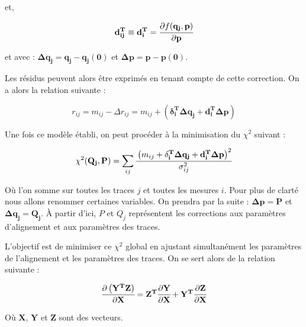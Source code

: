 \begin{appendices}
   et, 
   
   \begin{equation}
     \mathbf{d_{ij}^T} \equiv \mathbf{d_i^T} = \cfrac{\partial f(\mathbf{q_j},\mathbf{p})}{\partial \mathbf{p} }
   \end{equation}
   
   et avec : $\mathbf{\Delta q_j} = \mathbf{q_j} - \mathbf{q_j(0)}$ et $ \mathbf{\Delta p} = \mathbf{p} - \mathbf{p(0)} $.
   
   \medskip
   
   Les r\'esidus peuvent alors \^etre exprim\'es en tenant compte de cette correction. On a alors la relation suivante :
   
   \begin{equation}
   r_{ij} = m_{ij} - \Delta r_{ij} = m_{ij} + \left( \mathbf{\delta_i^T} \mathbf{\Delta q_j} + \mathbf{d_i^T} \mathbf{\Delta p} \right)
   \end{equation}
   
   Une fois ce mod\`ele \'etabli, on peut proc\'eder \`a la minimisation du $\chi^2$ suivant :
   
   \begin{equation}
    \chi^2(\mathbf{Q_j}, \mathbf{P}) = \sum_{ij} \cfrac{ \left( m_{ij} + \mathbf{\delta_i^T} \mathbf{\Delta q_j} + \mathbf{d_i^T} \mathbf{\Delta p} \right)^2}{\sigma_{ij}^2}
   \end{equation}

   O\`u l'on somme sur toutes les traces $j$ et toutes les mesures $i$.
   Pour plus de clart\'e nous allons renommer certaines variables. On prendra par la suite : $\mathbf{\Delta p} = \mathbf{P}$ et $\mathbf{\Delta q_j} = \mathbf{Q_j}$. \`A partir d'ici, $P$ et $Q_j$ repr\'esentent les corrections aux param\`etres d'alignement et aux param\`etres des traces.
   
   \medskip
   
   L'objectif est de minimiser ce $\chi^2$ global en ajustant simultan\'ement les param\`etres de l'alignement et les param\`etres des traces. On se sert alors de la relation suivante :
   
   \begin{equation}
    \cfrac{\partial \left( \mathbf{Y^T Z} \right) }{\partial \mathbf{X}} = \mathbf{Z^T} \cfrac{\partial \mathbf{Y} }{\partial \mathbf{X}} + \mathbf{Y^T} \cfrac{\partial \mathbf{Z} }{\partial \mathbf{X}}
   \end{equation}

   O\`u $\mathbf{X}$, $\mathbf{Y}$ et $\mathbf{Z}$ sont des vecteurs.
   

\end{appendices}
